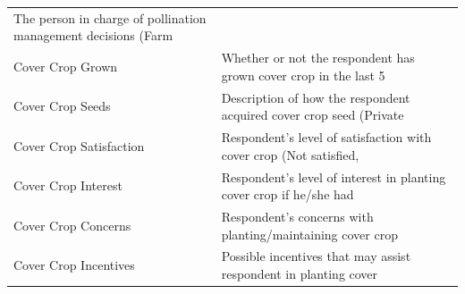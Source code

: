\documentclass[12pt,]{article}
\begin{document}
\begin{longtable}[]{@{}ll@{}}
\begin{minipage}[t]{0.18\columnwidth}
The person in charge of pollination management decisions (Farm\strut
\end{minipage}\tabularnewline
\begin{minipage}[t]{0.38\columnwidth}\raggedright\strut
Cover Crop Grown\strut
\end{minipage} & \begin{minipage}[t]{0.18\columnwidth}\raggedright\strut
Whether or not the respondent has grown cover crop in the last 5\strut
\end{minipage}\tabularnewline
\begin{minipage}[t]{0.38\columnwidth}\raggedright\strut
Cover Crop Seeds\strut
\end{minipage} & \begin{minipage}[t]{0.18\columnwidth}\raggedright\strut
Description of how the respondent acquired cover crop seed
(Private\strut
\end{minipage}\tabularnewline
\begin{minipage}[t]{0.38\columnwidth}\raggedright\strut
Cover Crop Satisfaction\strut
\end{minipage} & \begin{minipage}[t]{0.18\columnwidth}\raggedright\strut
Respondent's level of satisfaction with cover crop (Not satisfied,\strut
\end{minipage}\tabularnewline
\begin{minipage}[t]{0.38\columnwidth}\raggedright\strut
Cover Crop Interest\strut
\end{minipage} & \begin{minipage}[t]{0.18\columnwidth}\raggedright\strut
Respondent's level of interest in planting cover crop if he/she
had\strut
\end{minipage}\tabularnewline
\begin{minipage}[t]{0.38\columnwidth}\raggedright\strut
Cover Crop Concerns\strut
\end{minipage} & \begin{minipage}[t]{0.18\columnwidth}\raggedright\strut
Respondent's concerns with planting/maintaining cover crop\strut
\end{minipage}\tabularnewline
\begin{minipage}[t]{0.38\columnwidth}\raggedright\strut
Cover Crop Incentives\strut
\end{minipage} & \begin{minipage}[t]{0.18\columnwidth}\raggedright\strut
Possible incentives that may assist respondent in planting cover\strut
\end{minipage}\tabularnewline

\end{longtable}
\end{document}
